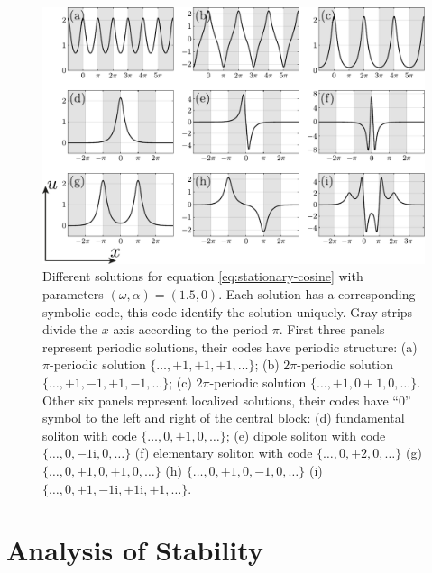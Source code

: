 \begin{figure}[h]
\centering
	\includegraphics[scale = 1]{pic/solutions for cosine equation}
	\caption{
		Different solutions for equation \eqref{eq:stationary-cosine} with parameters $(\omega, \alpha) = (1.5, 0)$.
		Each solution has a corresponding symbolic code, this code identify the solution uniquely.
		Gray strips divide the $x$ axis according to the period $\pi$.
		First three panels represent periodic solutions, their codes have periodic structure: (a) $\pi$-periodic solution $\{ \dots, +1, +1, +1, \dots \}$; (b) $2 \pi$-periodic solution $\{ \dots, +1, -1, +1, -1, \dots \}$; (c) $2 \pi$-periodic solution $\{ \dots, +1, 0 +1, 0, \dots \}$.
		Other six panels represent localized solutions, their codes have ``$0$'' symbol to the left and right of the central block: (d) fundamental soliton with code $\{ \dots, 0, +1, 0, \dots \}$; (e) dipole soliton with code $\{ \dots, 0, -1\mathrm{i}, 0, \dots \}$ (f) elementary soliton with code $\{ \dots, 0, +2, 0, \dots \}$ (g) $\{ \dots, 0, +1, 0, +1, 0, \dots \}$ (h) $\{ \dots, 0, +1, 0, -1, 0, \dots \}$ (i) $\{ \dots, 0, +1, -1\mathrm{i}, +1\mathrm{i}, +1, \dots \}$.
	}
\label{fig:solutions-cosine}
\end{figure}

\section{Analysis of Stability}

